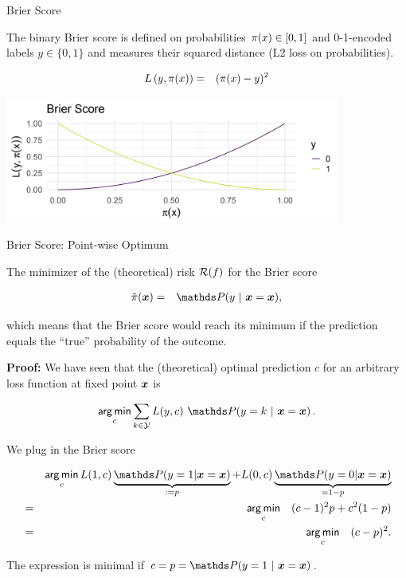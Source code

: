 \begin{vbframe}{Brier Score}

The binary Brier score is defined on probabilities $\pi(x) \in [0, 1]$ and 0-1-encoded labels $y \in \{0, 1\}$ and measures their squared distance (L2 loss on probabilities).

\begin{eqnarray*}
L\left(y, \pi(x)\right) &=& (\pi(x) - y)^2
\end{eqnarray*}

\vspace{0.2cm}
\begin{center}
\includegraphics[width = 11cm ]{figure_man/Brier-score.png} \\
\end{center}


\end{vbframe}

\begin{vbframe}{Brier Score: Point-wise Optimum}

The minimizer of the (theoretical) risk $\mathcal{R}(f)$ for the Brier score  

\begin{eqnarray*}
\hat \pi(\xv) &=& \P(y~|~\xv = \xv),
\end{eqnarray*}

which means that the Brier score would reach its minimum if the prediction equals the \enquote{true} probability of the outcome. 

\lz 

\textbf{Proof: }We have seen that the (theoretical) optimal prediction $c$ for an arbitrary loss function at fixed point $\bm{x}$ is

$$
\argmin_{c} \sum_{k \in \Yspace} L(y, c) ~ \P(y = k~|~ \xv = \xv)\,.
$$

We plug in the Brier score

\vspace*{-0.3cm}

\begin{footnotesize}
  \begin{eqnarray*}
    && \argmin_c L(1, c) \underbrace{\P(y = 1| \xv = \xv)}_{:= p} + L(0, c) \underbrace{\P(y = 0| \xv = \xv)}_{= 1 - p} \\ 
    &=&  \argmin_c \quad (c - 1)^2 p + c^2 (1 - p)\\
    &=&  \argmin_c \quad (c - p)^2.
  \end{eqnarray*}
\end{footnotesize}

The expression is minimal if $c = p = \P(y = 1~|~\xv = \xv)$.

\end{vbframe}

